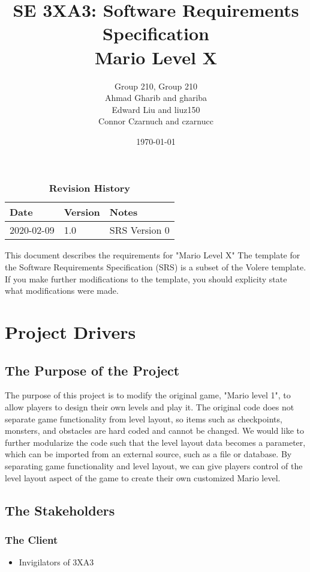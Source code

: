 \documentclass[12pt, titlepage]{article}
\title{SE 3XA3: Software Requirements Specification\\Mario Level X}
\author{Group 210, Group 210
		\\ Ahmad Gharib and ghariba
		\\ Edward Liu and liuz150
		\\ Connor Czarnuch and czarnucc
}
\date{\today}
\begin{document}
\maketitle

\tableofcontents
\listoftables
\listoffigures

\begin{table}[bp]
\caption{\bf Revision History}
\begin{tabularx}{\textwidth}{p{3cm}p{2cm}X}
\toprule {\bf Date} & {\bf Version} & {\bf Notes}\\
\midrule
2020-02-09 & 1.0 & SRS Version 0\\
\bottomrule
\end{tabularx}
\end{table}

\newpage


This document describes the requirements for "Mario Level X"  The template for the Software
Requirements Specification (SRS) is a subset of the Volere
template.  If you make further modifications
to the template, you should explicity state what modifications were made.

\section{Project Drivers}

\subsection{The Purpose of the Project}
The purpose of this project is to modify the original game, "Mario level 1", to allow players to design their own levels and play it. The original code does not separate game functionality from level layout, so items such as checkpoints, monsters, and obstacles are hard coded and cannot be changed. We would like to further modularize the code such that the level layout data becomes a parameter, which can be imported from an external source, such as a file or database. By separating game functionality and level layout, we can give players control of the level layout aspect of the game to create their own customized Mario level.

\subsection{The Stakeholders}

\subsubsection{The Client}
\begin{itemize}
    \item Invigilators of 3XA3
\end{itemize}
\end{document}
